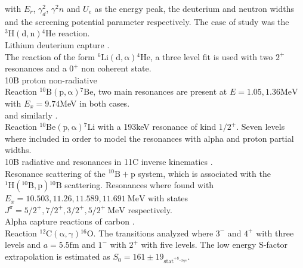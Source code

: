 \documentclass[openany]{book}
\begin{document}
with $E_r$, $\gamma^{2}_d$, $\gamma^{2}n$ and $U_e$ as the energy peak, the deuterium and neutron widths and the screening potential parameter respectively. The case of study was the $\mathrm{{}^{3}H(d, n){}^{4}He}$ reaction.\\

Lithium deuterium capture \cite{grineviciute_lamia_mukhamedzhanov_spitaleri_lacognata_2015}. \\

The reaction of the form $\mathrm{{}^{6}Li(d, \alpha){}^{4}He}$, a three level fit is used with two $2^{+}$ resonances and a $0^{+}$ non coherent state. \\

10B proton non-radiative \cite{kolk_macon_deboer_anderson_boeltzig_brandenburg_brune_chen_clark_danley_et_2022}  \\

Reaction $\mathrm{{}^{10}B(p, \alpha){}^{7}Be}$, two main resonances are present at $E = 1.05, 1.36\mathrm{MeV}$ with $E_x = 9.74$MeV in both cases. \\

and similarly \cite{sieverding_randhawa_zetterberg_deboer_ahn_mancino_martinez-pinedo_hix_2022}. \\

Reaction $\mathrm{{}^{10}Be(p, \alpha){}^{7}Li}$ with a 193keV resonance of kind $1/2^{+}$. Seven levels where included in order to model the resonances with alpha and proton partial widths. \\

10B radiative and resonances in 11C inverse kinematics \cite{kaur_guimaraes_zamora_assuncao_alcantara-nunez_delara_zevallos_ribeiro_lichtenthaler_pires_et_2022}. \\


Resonance scattering of the $\mathrm{{}^{10}B + p}$ system,  which is associated with the $\mathrm{{}^{1}H({}^{10}B, p){}^{10}B}$ scattering. Resonances where found with $E_x = 10.503, 11.26, 11.589, 11.691 \ \mathrm{MeV}$ with states $J^{\pi} = 5/2^{+}, 7/2^{+}, 3/2^{+}, 5/2^{+} \ \mathrm{MeV}$ respectively. \\

Alpha capture reactions of carbon \cite{schurmann_gialanella_kunz_strieder_2012}.  \\

Reaction $\mathrm{{}^{12}C(\alpha, \gamma){}^{16}O}$. The transitions analyzed where $3^{-}$ and $4^{+}$ with three levels and $a = 5.5\mathrm{fm}$ and $1^{-}$ with ${2}^{+}$ with five levels. The low energy S-factor extrapolation is estimated as $S_0 = 161 \pm 19_{\mathrm{stat}^{\mathrm{+8}_{-2\mathrm{sys}}}}$. \\
\end{document}
